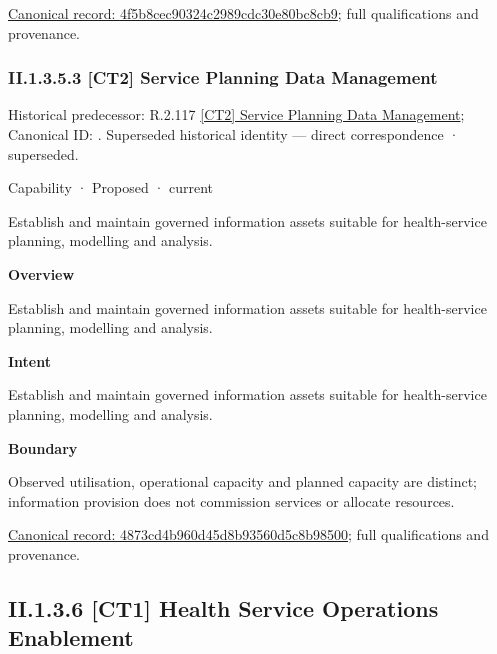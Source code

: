 {\footnotesize \href{../../../../continuum/strategy/capability/4f5b8cec90324c2989cdc30e80bc8cb9.md}{Canonical record: 4f5b8cec90324c2989cdc30e80bc8cb9}; full qualifications and provenance.}\par
\subsubsection*{II.1.3.5.3 [CT2] Service Planning Data Management}
\label{navigation:II.1.3.5.3}

{\small Historical predecessor: R.2.117 \hyperref[element:19263e0802cc4b88af7a345f1410cffd]{[CT2] Service Planning Data Management}; Canonical ID: \texttt{}. Superseded historical identity — direct correspondence · superseded.}\par
\label{element:4873cd4b960d45d8b93560d5c8b98500}
{\small Capability · Proposed · current}\par

Establish and maintain governed information assets suitable for health-service planning, modelling and analysis.



\textbf{Overview}



Establish and maintain governed information assets suitable for health-service planning, modelling and analysis.



\textbf{Intent}



Establish and maintain governed information assets suitable for health-service planning, modelling and analysis.



\textbf{Boundary}



Observed utilisation, operational capacity and planned capacity are distinct; information provision does not commission services or allocate resources.


{\footnotesize \href{../../../../continuum/strategy/capability/4873cd4b960d45d8b93560d5c8b98500.md}{Canonical record: 4873cd4b960d45d8b93560d5c8b98500}; full qualifications and provenance.}\par
\subsection*{II.1.3.6 [CT1] Health Service Operations Enablement}
\label{navigation:II.1.3.6}

